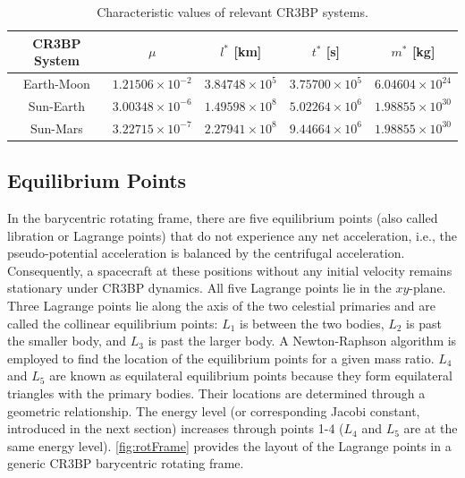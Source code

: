 \begin{table}[H]
    \centering
    \caption{Characteristic values of relevant CR3BP systems.}
    \begin{tabular}{|c|c|c|c|c|}
        \hline
        \textbf{CR3BP System}   &   \boldmath$\mu$          &   \boldmath$l^{*}$ \textbf{[km]}  &   \boldmath$t^{*}$ \textbf{[s]}   &   \boldmath$m^{*}$ \textbf{[kg]}  \\  \hline
        Earth-Moon              &   $1.21506\times10^{-2}$  &   $3.84748\times10^{5}$           &   $3.75700\times10^{5}$           &   $6.04604\times10^{24}$          \\  \hline
        Sun-Earth               &   $3.00348\times10^{-6}$  &   $1.49598\times10^{8}$           &   $5.02264\times10^{6}$           &   $1.98855\times10^{30}$          \\  \hline
        Sun-Mars                &   $3.22715\times10^{-7}$  &   $2.27941\times10^{8}$           &   $9.44664\times10^{6}$           &   $1.98855\times10^{30}$          \\  \hline
    \end{tabular}
    \label{tab:charValues}
\end{table}

\subsection{Equilibrium Points}
In the barycentric rotating frame, there are five equilibrium points (also called libration or
Lagrange points) that do not experience any net acceleration, i.e., the pseudo-potential
acceleration is balanced by the centrifugal acceleration. Consequently, a spacecraft at these
positions without any initial velocity remains stationary under CR3BP dynamics. All five Lagrange
points lie in the $xy$-plane. Three Lagrange points lie along the axis of the two celestial
primaries and are called the collinear equilibrium points: $L_{1}$ is between the two bodies,
$L_{2}$ is past the smaller body, and $L_{3}$ is past the larger body. A Newton-Raphson algorithm
is employed to find the location of the equilibrium points for a given mass ratio. $L_{4}$ and
$L_{5}$ are known as equilateral equilibrium points because they form equilateral triangles with
the primary bodies. Their locations are determined through a geometric relationship. The energy
level (or corresponding Jacobi constant, introduced in the next section) increases through points
1-4 ($L_{4}$ and $L_{5}$ are at the same energy level). \cref{fig:rotFrame} provides the layout of
the Lagrange points in a generic CR3BP barycentric rotating frame.

